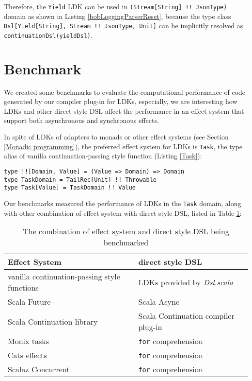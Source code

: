 Therefore, the \lstinline{Yield} LDK can be used in \lstinline{(Stream[String] !! JsonType)} domain as shown in Listing \ref{bobLoggingParserReset}, because the type class \lstinline{Dsl[Yield[String], Stream !! JsonType, Unit]} can be implicitly resolved as \lstinline{continuationDsl(yieldDsl)}.

\section{Benchmark}\label{Benchmark}

We created some benchmarks to evaluate the computational performance of code generated by our compiler plug-in for LDKs, especially, we are interesting how LDKs and other direct style DSL affect the performance in an effect system that support both asynchronous and synchronous effects.

In spite of LDKs of adapters to monads or other effect systems (see Section \ref{Monadic programming}), the preferred effect system for LDKs is \lstinline{Task}, the type alias of vanilla continuation-passing style function (Listing \ref{Task}):

\begin{lstlisting}[float=htbp,caption={The definition of \lstinline{Task}, the preferred effect system using with LDKs},label={Task}]
type !![Domain, Value] = (Value => Domain) => Domain
type TaskDomain = TailRec[Unit] !! Throwable
type Task[Value] = TaskDomain !! Value
\end{lstlisting}

Our benchmarks measured the performance of LDKs in the \lstinline{Task} domain, along with other combination of effect system with direct style DSL, listed in Table \ref{combination}:

\begin{table}[htbp]
  \begin{tabular}{l|l}
    Effect System & direct style DSL \\
    \hline
    vanilla continuation-passing style functions & LDKs provided by \textit{Dsl.scala} \\
    Scala Future \cite{haller2012sip} & Scala Async \cite{haller2013sip} \\
    Scala Continuation library \cite{rompf2009implementing} & Scala Continuation compiler plug-in \\
    Monix tasks \cite{nedelcu2017monix} & \texttt{for} comprehension \\
    Cats effects \cite{typelevel2017cats} & \texttt{for} comprehension \\
    Scalaz Concurrent \cite{kenji2017scalaz} & \texttt{for} comprehension \\
  \end{tabular}
  \caption{The combination of effect system and direct style DSL being benchmarked}
  \label{combination}
\end{table}

